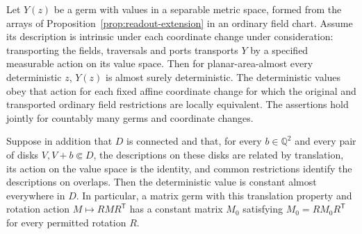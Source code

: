 \begin{lemma}
\label{lem:deterministic-germs}
Let \(Y(z)\) be a germ with values in a separable metric space, formed
from the arrays of Proposition~\ref{prop:readout-extension} in an
ordinary field chart.  Assume its description is intrinsic under each
coordinate change under consideration: transporting the fields,
traversals and ports transports \(Y\) by a specified measurable action
on its value space.  Then for planar-area-almost every deterministic
\(z\), \(Y(z)\) is almost surely deterministic.  The deterministic
values obey that action for each fixed affine coordinate change for
which the original and transported ordinary field restrictions are
locally equivalent.  The assertions hold jointly for countably many
germs and coordinate changes.

Suppose in addition that \(D\) is connected and that, for every
\(b\in\mathbb Q^2\) and every pair of disks \(V,V+b\Subset D\), the
descriptions on these disks are related by translation, its action on
the value space is the identity, and common restrictions identify the
descriptions on overlaps.  Then the deterministic value is constant
almost everywhere in \(D\).  In particular, a matrix germ with this
translation property and rotation action \(M\mapsto RMR^{\mathsf T}\)
has a constant matrix \(M_0\) satisfying
\(M_0=RM_0R^{\mathsf T}\) for every permitted rotation \(R\).
\end{lemma}

